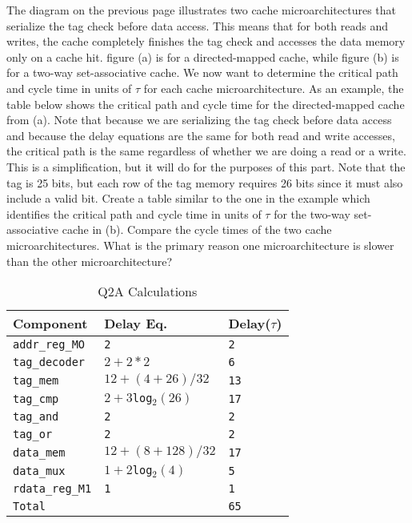 \documentclass[a4paper,11pt]{article}
\newcommand{\T}{\texttt}
\newcommand{\V}{\verb}
\begin{document}
The diagram on the previous page illustrates two cache microarchitectures that serialize the tag check before data access. This means that for both reads and writes, the cache completely finishes the tag check and accesses the data memory only on a cache hit. figure (a) is for a directed-mapped cache, while figure (b) is for a two-way set-associative cache. We now want to determine the critical path and cycle time in units of $\tau$ for each cache microarchitecture. As an example, the table below shows the critical path and cycle time for the directed-mapped cache from (a). Note that because we are serializing the tag check before data access and because the delay equations are the same for both read and write accesses, the critical path is the same regardless of whether we are doing a read or a write. This is a simplification, but it will do for the purposes of this part. Note that the tag is 25 bits, but each row of the tag memory requires 26 bits since it must also include a valid bit. Create a table similar to the one in the example which identifies the critical path and cycle time in units of $\tau$ for the two-way set-associative cache in (b). Compare the cycle times of the two cache microarchitectures. What is the primary reason one microarchitecture is slower than the other microarchitecture?

\begin{table}[H]
\caption{Q2A Calculations} \label{tab:q2Atable} 
\begin{center}
\begin{tabular}{| l | l | l |}
\hline
  Component         &  Delay Eq.              & Delay($\tau$)          \\ \hline
  \V.addr_reg_MO.   &   \T{2}                 & \T{2}                  \\ \hline
  \V.tag_decoder.   &   \T{$2+2*2$}           & \T{6}                  \\ \hline
  \V.tag_mem.       &   \T{$12+(4+26)/32$}    & \T{13}                 \\ \hline
  \V.tag_cmp.       &   \T{$2+3$log$_2(26)$}  & \T{17}                 \\ \hline
  \V.tag_and.       &   \T{2}                 & \T{2}                  \\ \hline
  \V.tag_or.        &   \T{2}                 & \T{2}                  \\ \hline
  \V.data_mem.      &   \T{$12+(8+128)/32$}   & \T{17}                 \\ \hline
  \V.data_mux.      &   \T{$1+2$log$_2(4)$}   & \T{5}                  \\ \hline
  \V.rdata_reg_M1.  &   \T{1}                 & \T{1}                  \\ \hline 
  \V.Total.         &   \T{}                  & \T{65}                 \\ \hline
\end{tabular}
\end{center}
\end{table}
\end{document}
